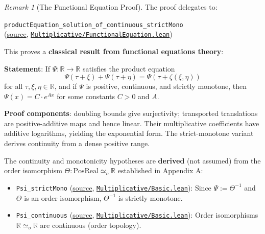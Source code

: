 \documentclass[11pt]{article}
\theoremstyle{definition}
\theoremstyle{remark}
\newtheorem{remark}[theorem]{Remark}
\begin{document}
\begin{remark}[The Functional Equation Proof]
The proof delegates to:

\texttt{productEquation\_solution\_of\_continuous\_strictMono}
\\
(\href{https://github.com/zariuq/ks-foundations-of-inference/blob/main/KnuthSkilling/Multiplicative/FunctionalEquation.lean}{source}, \href{https://github.com/zariuq/ks-foundations-of-inference/blob/main/KnuthSkilling/Multiplicative/FunctionalEquation.lean}{\texttt{Multiplicative/FunctionalEquation.lean}})

This proves a \textbf{classical result from functional equations theory}:

\textbf{Statement}: If $\Psi : \mathbb{R} \to \mathbb{R}$ satisfies the product equation
\[ \Psi(\tau + \xi) + \Psi(\tau + \eta) = \Psi(\tau + \zeta(\xi, \eta)) \]
for all $\tau, \xi, \eta \in \mathbb{R}$, and if $\Psi$ is positive, continuous, and strictly monotone, then $\Psi(x) = C \cdot e^{Ax}$ for some constants $C > 0$ and $A$.

\textbf{Proof components}: doubling bounds give surjectivity; transported
translations are positive-additive maps and hence linear. Their multiplicative
coefficients have additive logarithms, yielding the exponential form.
The strict-monotone variant derives continuity from a dense positive range.


The continuity and monotonicity hypotheses are \textbf{derived} (not assumed) from the order isomorphism $\Theta : \text{PosReal} \simeq_o \mathbb{R}$ established in Appendix A:

\begin{itemize}
\item \texttt{Psi\_strictMono} (\href{https://github.com/zariuq/ks-foundations-of-inference/blob/main/KnuthSkilling/Multiplicative/Basic.lean}{source}, \href{https://github.com/zariuq/ks-foundations-of-inference/blob/main/KnuthSkilling/Multiplicative/Basic.lean}{\texttt{Multiplicative/Basic.lean}}): Since $\Psi := \Theta^{-1}$ and $\Theta$ is an order isomorphism, $\Theta^{-1}$ is strictly monotone.
\item \texttt{Psi\_continuous} (\href{https://github.com/zariuq/ks-foundations-of-inference/blob/main/KnuthSkilling/Multiplicative/Basic.lean}{source}, \href{https://github.com/zariuq/ks-foundations-of-inference/blob/main/KnuthSkilling/Multiplicative/Basic.lean}{\texttt{Multiplicative/Basic.lean}}): Order isomorphisms $\mathbb{R} \simeq_o \mathbb{R}$ are continuous (order topology).
\end{itemize}
\end{remark}
\end{document}
